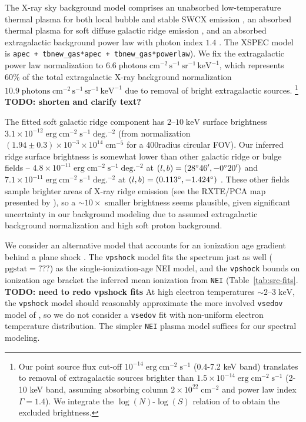 \documentclass[preprint2,tighten,trackchanges]{aastex6}
\newcommand*{\mt}{\mathrm}
\newcommand*{\unit}[1]{\;\mt{#1}}  %
\newcommand*{\abt}{\mathord{\sim}} %
\newcommand*{\nHUnits}{\times 10^{22} \unit{cm^{-2}}}
\begin{document}
The X-ray sky background model comprises an unabsorbed low-temperature thermal
plasma for both local bubble and stable SWCX emission
\citep{mccammon1990, snowden1990, cravens2000, galeazzi2014, smith2014},
an absorbed thermal plasma for soft diffuse galactic ridge emission
\citep[e.g.][]{kaneda1997}, and an absorbed extragalactic
background power law with photon index $1.4$ \citep{hickox2006}.
The XSPEC model is \texttt{apec + tbnew\_gas*apec + tbnew\_gas*powerlaw}).
We fix the extragalactic power law normalization to
$6.6 \unit{photons\; cm^{-2}\, s^{-1}\, sr^{-1}\, keV^{-1}}$, which
represents $60\%$ of the total extragalactic X-ray background normalization
$10.9 \unit{photons\; cm^{-2}\, s^{-1}\, sr^{-1}\, keV^{-1}}$
\citep{hickox2006} due to removal of bright extragalactic sources.
\footnote{Our point source flux cut-off $10^{-14} \unit{erg\;cm^{-2}\;s^{-1}}$
(0.4-7.2 keV band) translates to removal of extragalactic sources brighter than
$1.5 \times 10^{-14} \unit{erg\;cm^{-2}\;s^{-1}}$ (2-10 keV band, assuming
absorbing column $2 \nHUnits$ and power law index $\Gamma = 1.4$).
We integrate the $\log(N)$-$\log(S)$ relation of \citet{moretti2003} to obtain
the excluded brightness.}
\textbf{TODO: shorten and clarify text?}  %

The fitted soft galactic ridge component has $2$--$10 \unit{keV}$ surface
brightness $3.1 \times 10^{-12} \unit{erg\;cm^{-2}\;s^{-1}\;deg.^{-2}}$ (from
normalization $(1.94 \pm 0.3) \times 10^{-3} \times 10^{14} \unit{cm^{-5}}$ for
a 400\arcsec radius circular FOV).
Our inferred ridge surface brightness is somewhat lower than
other galactic ridge or bulge fields --
$4.8 \times 10^{-11} \unit{erg\;cm^{-2}\;s^{-1}\;deg.^{-2}}$
at $(l,b) = (28\mbox{$^\circ$} 46\mbox{$^\prime$}, -0\mbox{$^\circ$} 20\mbox{$^\prime$})$ \citep{ebisawa2008}
and
$7.1 \times 10^{-11} \unit{erg\;cm^{-2}\;s^{-1}\;deg.^{-2}}$
at $(l,b) = (0.113\mbox{$^\circ$}, -1.424\mbox{$^\circ$})$ \citep{revnivtsev2009}.
These other fields sample brighter areas of X-ray ridge emission (see the
RXTE/PCA map presented by \citet{revnivtsev2006}), so a $\abt 10\times$ smaller
brightness seems plausible, given significant uncertainty in our background
modeling due to assumed extragalactic background normalization and high soft
proton background.

We consider an alternative model that accounts for an ionization age gradient
behind a plane shock \citep{borkowski2001}.
The \texttt{vpshock} model fits the spectrum just as well
($\mathrm{pgstat} = ???$) as the single-ionization-age NEI model, and the
\texttt{vpshock} bounds on ionization age bracket the inferred mean ionization
from \texttt{NEI} (Table~\ref{tab:src-fits}.
\textbf{TODO: need to redo vpshock fits}
At high electron temperatures $\abt 2$--$3 \unit{keV}$, the
\texttt{vpshock} model should reasonably approximate the more involved
\texttt{vsedov} model of \citet{borkowski2001}, so we do not consider a
\texttt{vsedov} fit with non-uniform electron temperature distribution.
The simpler \texttt{NEI} plasma model suffices for our spectral modeling.
\end{document}
